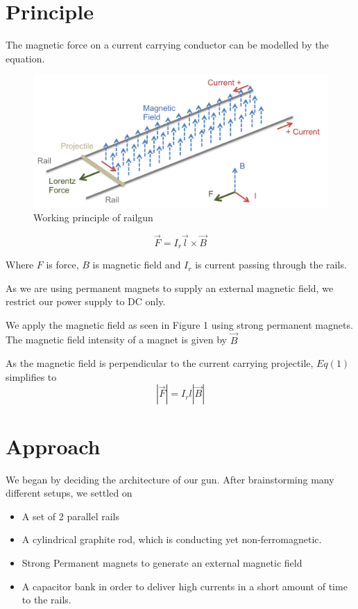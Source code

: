 \documentclass[twocolumn]{article}
\begin{document}
\section{Principle}

The magnetic force on a current carrying conductor can be modelled by the equation. 
	
\begin{figure}[htp]
	\caption{Working principle of railgun}
	\includegraphics[width=\linewidth]{railgun_physics.png}
\end{figure}
	
\begin{equation}
\vec{F}=I_{r} \vec{l} \times \vec{B}
\end{equation}

Where $F$ is force, $B$ is magnetic field and $I_{r}$ is current passing through the rails.

As we are using permanent magnets to supply an external magnetic field, we restrict our power supply to DC only.
 
	We apply the magnetic field as seen in Figure 1 using strong permanent magnets. The magnetic field intensity of a magnet is given by $\vec{B}$
	

As the magnetic field is perpendicular to the current carrying projectile, $Eq(1)$ simplifies to
 \[|\vec{F}|=I_{r} l|\vec{B}|\]



 

\section{Approach}
We began by deciding the architecture of our gun.
After brainstorming many different setups, we settled on 

\begin{itemize}
\item A set of 2 parallel rails
\item A cylindrical graphite rod, which is conducting yet non-ferromagnetic.
\item Strong Permanent magnets to generate an external magnetic field
\item A capacitor bank in order to deliver high currents in a short amount of time to the rails.
\end{itemize}
\end{document}
